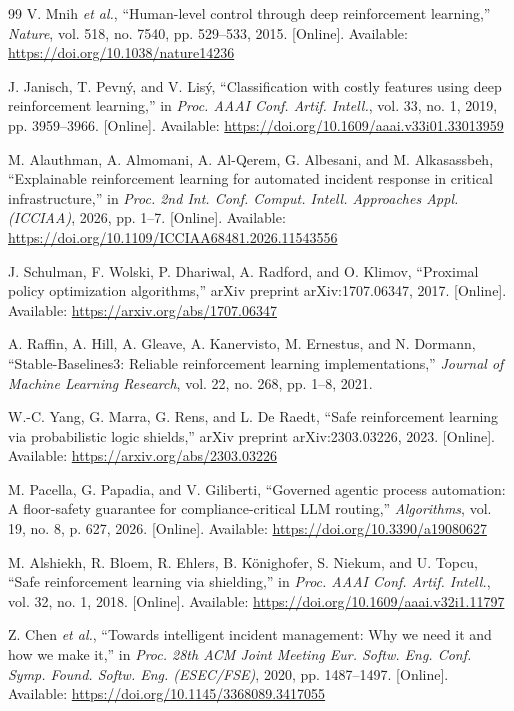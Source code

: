 \documentclass[12pt,a4paper]{article}
\begin{document}
\begin{thebibliography}{99}
 V. Mnih \emph{et al.}, ``Human-level control through deep reinforcement learning,'' \emph{Nature}, vol. 518, no. 7540, pp. 529--533, 2015. [Online]. Available: \url{https://doi.org/10.1038/nature14236}

 J. Janisch, T. Pevn\'{y}, and V. Lis\'{y}, ``Classification with costly features using deep reinforcement learning,'' in \emph{Proc. AAAI Conf. Artif. Intell.}, vol. 33, no. 1, 2019, pp. 3959--3966. [Online]. Available: \url{https://doi.org/10.1609/aaai.v33i01.33013959}

 M. Alauthman, A. Almomani, A. Al-Qerem, G. Albesani, and M. Alkasassbeh, ``Explainable reinforcement learning for automated incident response in critical infrastructure,'' in \emph{Proc. 2nd Int. Conf. Comput. Intell. Approaches Appl. (ICCIAA)}, 2026, pp. 1--7. [Online]. Available: \url{https://doi.org/10.1109/ICCIAA68481.2026.11543556}

 J. Schulman, F. Wolski, P. Dhariwal, A. Radford, and O. Klimov, ``Proximal policy optimization algorithms,'' arXiv preprint arXiv:1707.06347, 2017. [Online]. Available: \url{https://arxiv.org/abs/1707.06347}

 A. Raffin, A. Hill, A. Gleave, A. Kanervisto, M. Ernestus, and N. Dormann, ``Stable-Baselines3: Reliable reinforcement learning implementations,'' \emph{Journal of Machine Learning Research}, vol. 22, no. 268, pp. 1--8, 2021.

 W.-C. Yang, G. Marra, G. Rens, and L. De Raedt, ``Safe reinforcement learning via probabilistic logic shields,'' arXiv preprint arXiv:2303.03226, 2023. [Online]. Available: \url{https://arxiv.org/abs/2303.03226}

 M. Pacella, G. Papadia, and V. Giliberti, ``Governed agentic process automation: A floor-safety guarantee for compliance-critical LLM routing,'' \emph{Algorithms}, vol. 19, no. 8, p. 627, 2026. [Online]. Available: \url{https://doi.org/10.3390/a19080627}

 M. Alshiekh, R. Bloem, R. Ehlers, B. K\"{o}nighofer, S. Niekum, and U. Topcu, ``Safe reinforcement learning via shielding,'' in \emph{Proc. AAAI Conf. Artif. Intell.}, vol. 32, no. 1, 2018. [Online]. Available: \url{https://doi.org/10.1609/aaai.v32i1.11797}

 Z. Chen \emph{et al.}, ``Towards intelligent incident management: Why we need it and how we make it,'' in \emph{Proc. 28th ACM Joint Meeting Eur. Softw. Eng. Conf. Symp. Found. Softw. Eng. (ESEC/FSE)}, 2020, pp. 1487--1497. [Online]. Available: \url{https://doi.org/10.1145/3368089.3417055}


\end{thebibliography}
\end{document}
